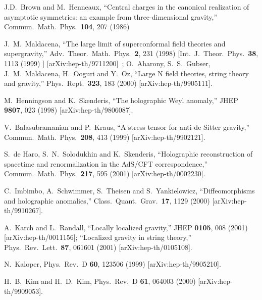 \documentclass[a4paper,12pt,oneside]{article}
\begin{document}
\vspace{5mm}


\begin{thebibliography}{99}

  J.D.~Brown and M.~Henneaux,
``Central charges in the canonical realization of asymptotic symmetries:
an example from three-dimensional gravity,''
Commun.\ Math.\ Phys.\  {\bf 104}, 207 (1986)

J.~M.~Maldacena,
``The large \coordHE{} limit of superconformal field theories and supergravity,''
Adv.\ Theor.\ Math.\ Phys.\  {\bf 2},  231 (1998)
[Int.\ J.\ Theor.\ Phys.\  {\bf 38},  1113  (1999) ]
[arXiv:hep-th/9711200]~; 
O.~Aharony, S.~S.~Gubser, J.~M.~Maldacena, H.~Ooguri and Y.~Oz,
``Large N field theories, string theory and gravity,''
Phys.\ Rept.\  {\bf 323}, 183 (2000)
[arXiv:hep-th/9905111].

M.~Henningson and K.~Skenderis,
``The holographic Weyl anomaly,''
JHEP {\bf 9807}, 023 (1998)
[arXiv:hep-th/9806087].


  V.~Balasubramanian and P.~Kraus,
``A stress tensor for anti-de Sitter gravity,''
Commun.\ Math.\ Phys.\  {\bf 208}, 413 (1999)
[arXiv:hep-th/9902121].

S.~de Haro, S.~N.~Solodukhin and K.~Skenderis,
``Holographic reconstruction of spacetime and
 renormalization in the  AdS/CFT correspondence,''
Commun.\ Math.\ Phys.\  {\bf 217}, 595 (2001)
[arXiv:hep-th/0002230].

C.~Imbimbo, A.~Schwimmer, S.~Theisen and S.~Yankielowicz,
``Diffeomorphisms and holographic anomalies,''
Class.\ Quant.\ Grav.\  {\bf 17}, 1129 (2000)
[arXiv:hep-th/9910267].


A.~Karch and L.~Randall,
``Locally localized gravity,''
JHEP {\bf 0105}, 008 (2001)
[arXiv:hep-th/0011156];
``Localized gravity in string theory,''
Phys.\ Rev.\ Lett.\  {\bf 87}, 061601 (2001)
[arXiv:hep-th/0105108].

N.~Kaloper,
Phys.\ Rev.\ D {\bf 60}, 123506 (1999)
[arXiv:hep-th/9905210].

H.~B.~Kim and H.~D.~Kim,
Phys.\ Rev.\ D {\bf 61}, 064003 (2000)
[arXiv:hep-th/9909053].



\end{thebibliography}
\end{document}
